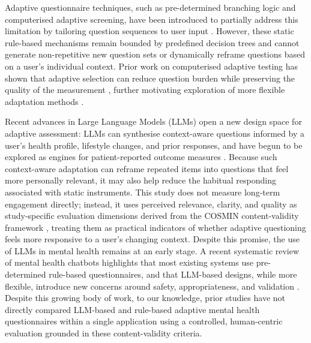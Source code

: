\documentclass[conference]{IEEEtran}
\begin{document}
Adaptive questionnaire techniques, such as pre-determined branching logic and computerised adaptive
screening, have been introduced to partially address this limitation by tailoring question
sequences to user input \cite{wang2023}. However, these static rule-based mechanisms remain
bounded by predefined decision trees and cannot generate non-repetitive new question sets
or dynamically reframe questions based on a user's individual context.
Prior work on computerised adaptive testing has shown that adaptive selection
can reduce question burden while preserving the quality of the measurement
\cite{gibbons2008, choi2010}, further motivating exploration of more flexible
adaptation methods \cite{malanin2025}.

Recent advances in Large Language Models (LLMs) open a new design space for adaptive
assessment: LLMs can synthesise context-aware questions informed by a user's health
profile, lifestyle changes, and prior responses, and have begun to be explored as
engines for patient-reported outcome measures \cite{terheyden2025}.
Because such context-aware adaptation can reframe repeated items into
questions that feel more personally relevant, it may also help reduce
the habitual responding associated with static instruments. This study
does not measure long-term engagement directly; instead, it uses
perceived relevance, clarity, and quality as study-specific evaluation
dimensions derived from the COSMIN content-validity framework
\cite{terwee2018}, treating them as practical indicators of whether
adaptive questioning feels more responsive to a user's changing context.
Despite this promise, the use of LLMs in
mental health remains at an early stage. A recent systematic review of
mental health chatbots highlights that most existing systems use
pre-determined rule-based questionnaires, and that LLM-based designs,
while more flexible, introduce new concerns around safety,
appropriateness, and validation \cite{hua2025, li2025llm, shen2026}.
Despite this growing body of work, to our knowledge, prior studies have
not directly compared LLM-based and rule-based adaptive mental health
questionnaires within a single application using a controlled,
human-centric evaluation grounded in these content-validity criteria.
\end{document}
